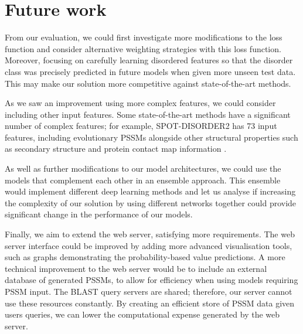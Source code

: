 \documentclass{l4proj}
\begin{document}
\section{Future work}

From our evaluation, we could first investigate more modifications to the loss function and consider alternative weighting strategies with this loss function. Moreover, focusing on carefully learning disordered features so that the disorder class was precisely predicted in future models when given more unseen test data. This may make our solution more competitive against state-of-the-art methods.

As we saw an improvement using more complex features, we could consider including other input features. Some state-of-the-art methods have a significant number of complex features; for example, SPOT-DISORDER2 has 73 input features, including evolutionary PSSMs alongside other structural properties such as secondary structure and protein contact map information \cite{Hanson:19}.

As well as further modifications to our model architectures, we could use the models that complement each other in an ensemble approach. This ensemble would implement different deep learning methods and let us analyse if increasing the complexity of our solution by using different networks together could provide significant change in the performance of our models.

Finally, we aim to extend the web server, satisfying more requirements. The web server interface could be improved by adding more advanced visualisation tools, such as graphs demonstrating the probability-based value predictions. A more technical improvement to the web server would be to include an external database of generated PSSMs, to allow for efficiency when using models requiring PSSM input. The BLAST query servers are shared; therefore, our server cannot use these resources constantly. By creating an efficient store of PSSM data given users queries, we can lower the computational expense generated by the web server.


%
% 
\end{document}
